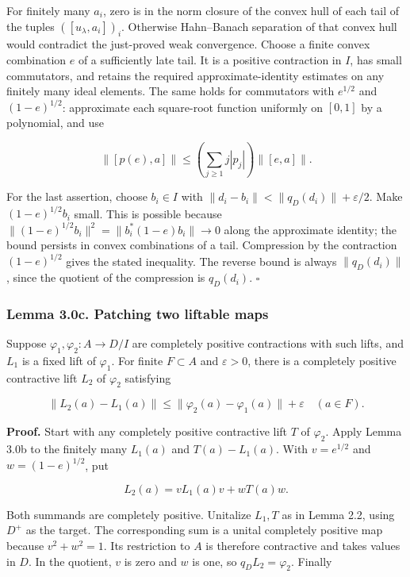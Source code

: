 \documentclass[
  11pt,
]{article}
\begin{document}
For finitely many \(a_i\), zero is in the norm closure of the convex
hull of each tail of the tuples \(([u_\lambda,a_i])_i\). Otherwise
Hahn--Banach separation of that convex hull would contradict the
just-proved weak convergence. Choose a finite convex combination \(e\)
of a sufficiently late tail. It is a positive contraction in \(I\), has
small commutators, and retains the required approximate-identity
estimates on any finitely many ideal elements. The same holds for
commutators with \(e^{1/2}\) and \((1-e)^{1/2}\): approximate each
square-root function uniformly on \([0,1]\) by a polynomial, and use

\[
\|[p(e),a]\|\leq
\left(\sum_{j\geq1}j|p_j|\right)\|[e,a]\|.
\]

For the last assertion, choose \(b_i\in I\) with
\(\|d_i-b_i\|<\|q_D(d_i)\|+\varepsilon/2\). Make \((1-e)^{1/2}b_i\)
small. This is possible because
\(\|(1-e)^{1/2}b_i\|^2=\|b_i^*(1-e)b_i\|\to0\) along the approximate
identity; the bound persists in convex combinations of a tail.
Compression by the contraction \((1-e)^{1/2}\) gives the stated
inequality. The reverse bound is always \(\|q_D(d_i)\|\), since the
quotient of the compression is \(q_D(d_i)\). \(\square\)

\subsubsection{Lemma 3.0c. Patching two liftable
maps}\label{lemma-3.0c.-patching-two-liftable-maps}

Suppose \(\varphi_1,\varphi_2:A\to D/I\) are completely positive
contractions with such lifts, and \(L_1\) is a fixed lift of
\(\varphi_1\). For finite \(F\subset A\) and \(\varepsilon>0\), there is
a completely positive contractive lift \(L_2\) of \(\varphi_2\)
satisfying

\[
\|L_2(a)-L_1(a)\|
\leq\|\varphi_2(a)-\varphi_1(a)\|+\varepsilon
\quad(a\in F).
\]

\textbf{Proof.} Start with any completely positive contractive lift
\(T\) of \(\varphi_2\). Apply Lemma 3.0b to the finitely many \(L_1(a)\)
and \(T(a)-L_1(a)\). With \(v=e^{1/2}\) and \(w=(1-e)^{1/2}\), put

\[
L_2(a)=vL_1(a)v+wT(a)w.
\]

Both summands are completely positive. Unitalize \(L_1,T\) as in Lemma
2.2, using \(D^+\) as the target. The corresponding sum is a unital
completely positive map because \(v^2+w^2=1\). Its restriction to \(A\)
is therefore contractive and takes values in \(D\). In the quotient,
\(v\) is zero and \(w\) is one, so \(q_DL_2=\varphi_2\). Finally
\end{document}
